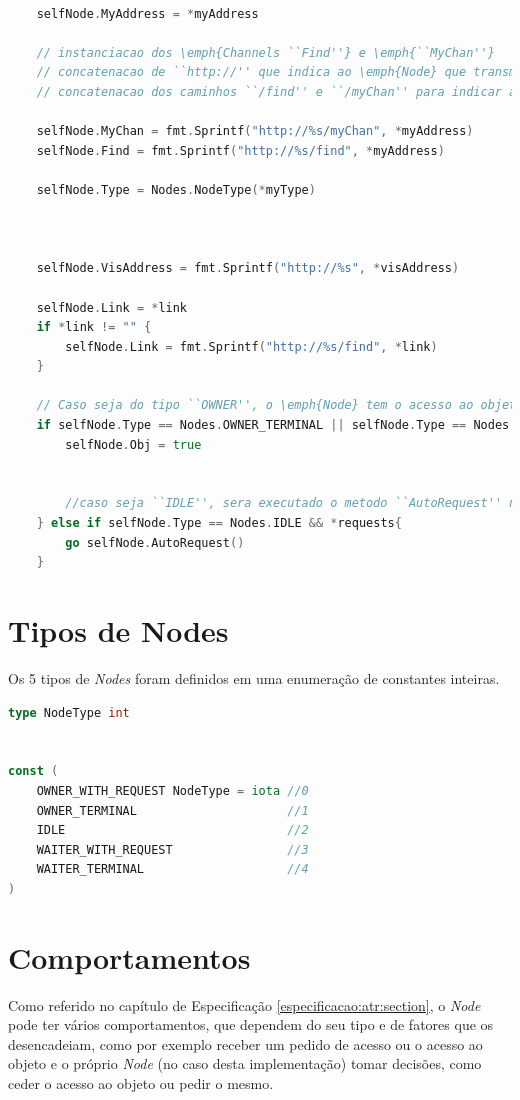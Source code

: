 \begin{lstlisting}[caption={Instanciação dos atributos do \emph{Node}.},language=Go]

	selfNode.MyAddress = *myAddress

	// instanciacao dos \emph{Channels ``Find''} e \emph{``MyChan''}
	// concatenacao de ``http://'' que indica ao \emph{Node} que transmitira o pedido que este deve ser um pedido \acs{HTTP}
	// concatenacao dos caminhos ``/find'' e ``/myChan'' para indicar aos \emph{Nodes} para que \emph{Channel} sera enviado

	selfNode.MyChan = fmt.Sprintf("http://%s/myChan", *myAddress)
	selfNode.Find = fmt.Sprintf("http://%s/find", *myAddress)

	selfNode.Type = Nodes.NodeType(*myType)



	selfNode.VisAddress = fmt.Sprintf("http://%s", *visAddress)

	selfNode.Link = *link
	if *link != "" {
		selfNode.Link = fmt.Sprintf("http://%s/find", *link)
	}

	// Caso seja do tipo ``OWNER'', o \emph{Node} tem o acesso ao objeto
	if selfNode.Type == Nodes.OWNER_TERMINAL || selfNode.Type == Nodes.OWNER_WITH_REQUEST {
		selfNode.Obj = true


		//caso seja ``IDLE'', sera executado o metodo ``AutoRequest'' numa nova \emph{Goroutine}
	} else if selfNode.Type == Nodes.IDLE && *requests{ 
		go selfNode.AutoRequest()
	}

\end{lstlisting}


\section{Tipos de Nodes}
\label{chap:imp:node:tipos}

Os 5 tipos de \emph{Nodes} foram definidos em uma enumeração de constantes inteiras.
\begin{lstlisting}[caption={Definição da enumeração dos tipos de \emph{Node}},language=Go]
type NodeType int


const (
	OWNER_WITH_REQUEST NodeType = iota //0
	OWNER_TERMINAL                     //1
	IDLE                               //2
	WAITER_WITH_REQUEST                //3
	WAITER_TERMINAL					   //4
)

\end{lstlisting}

\section{Comportamentos}
Como referido no capítulo de Especificação \ref{especificacao:atr:section}, 
o \emph{Node} pode ter vários comportamentos, 
que dependem do seu tipo e de fatores que os desencadeiam, como por exemplo receber um pedido de acesso ou o acesso ao objeto e 
o próprio \emph{Node} (no caso desta implementação) tomar decisões, como ceder o acesso ao objeto ou pedir o mesmo.

